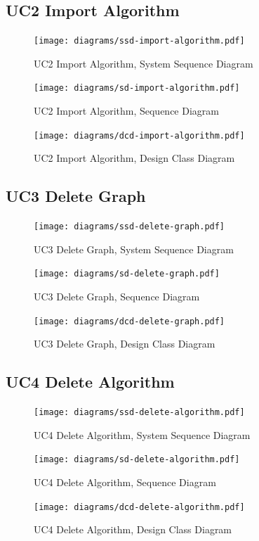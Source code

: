 \subsection{UC2 Import Algorithm}
\begin{figure}[H]
    \centering
    \texttt{[image: diagrams/ssd-import-algorithm.pdf]}
    \caption{UC2 Import Algorithm, System Sequence Diagram}
    \label{fig:import-algorithm-ssd}
\end{figure}
\begin{figure}[H]
    \centering
    \texttt{[image: diagrams/sd-import-algorithm.pdf]}
    \caption{UC2 Import Algorithm, Sequence Diagram}
    \label{fig:import-algorithm-sd}
\end{figure}
\begin{figure}[H]
    \centering
    \texttt{[image: diagrams/dcd-import-algorithm.pdf]}
    \caption{UC2 Import Algorithm, Design Class Diagram}
    \label{fig:import-algorithm-dcd}
\end{figure}
% 
\subsection{UC3 Delete Graph}
\begin{figure}[H]
    \centering
    \texttt{[image: diagrams/ssd-delete-graph.pdf]}
    \caption{UC3 Delete Graph, System Sequence Diagram}
    \label{fig:delete-graph-ssd}
\end{figure}
\begin{figure}[H]
    \centering
    \texttt{[image: diagrams/sd-delete-graph.pdf]}
    \caption{UC3 Delete Graph, Sequence Diagram}
    \label{fig:delete-graph-sd}
\end{figure}
\begin{figure}[H]
    \centering
    \texttt{[image: diagrams/dcd-delete-graph.pdf]}
    \caption{UC3 Delete Graph, Design Class Diagram}
    \label{fig:delete-graph-dcd}
\end{figure}
% 
\subsection{UC4 Delete Algorithm}
\begin{figure}[H]
    \centering
    \texttt{[image: diagrams/ssd-delete-algorithm.pdf]}
    \caption{UC4 Delete Algorithm, System Sequence Diagram}
    \label{fig:delete-algorithm-ssd}
\end{figure}
\begin{figure}[H]
    \centering
    \texttt{[image: diagrams/sd-delete-algorithm.pdf]}
    \caption{UC4 Delete Algorithm, Sequence Diagram}
    \label{fig:delete-algorithm-sd}
\end{figure}
\begin{figure}[H]
    \centering
    \texttt{[image: diagrams/dcd-delete-algorithm.pdf]}
    \caption{UC4 Delete Algorithm, Design Class Diagram}
    \label{fig:delete-algorithm-dcd}
\end{figure}
% 
